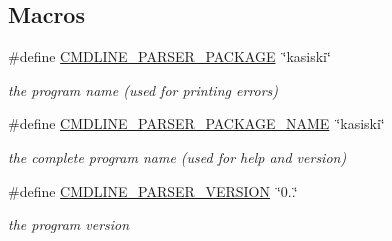 \subsection*{Macros}
\begin{DoxyCompactItemize}
\item 
\mbox{\label{kasiski-getopt_8h_aeb847973552c32bcbe5f14973a0a8a32}} 
\#define \hyperlink{kasiski-getopt_8h_aeb847973552c32bcbe5f14973a0a8a32}{C\+M\+D\+L\+I\+N\+E\+\_\+\+P\+A\+R\+S\+E\+R\+\_\+\+P\+A\+C\+K\+A\+GE}~\char`\"{}kasiski\char`\"{}
\begin{DoxyCompactList}\small\item\em the program name (used for printing errors) \end{DoxyCompactList}\item 
\mbox{\label{kasiski-getopt_8h_ae2f94765d0d8758ddf6b326a4806d6ff}} 
\#define \hyperlink{kasiski-getopt_8h_ae2f94765d0d8758ddf6b326a4806d6ff}{C\+M\+D\+L\+I\+N\+E\+\_\+\+P\+A\+R\+S\+E\+R\+\_\+\+P\+A\+C\+K\+A\+G\+E\+\_\+\+N\+A\+ME}~\char`\"{}kasiski\char`\"{}
\begin{DoxyCompactList}\small\item\em the complete program name (used for help and version) \end{DoxyCompactList}\item 
\mbox{\label{kasiski-getopt_8h_a1eeca7dc254bf6867ba9635f45771471}} 
\#define \hyperlink{kasiski-getopt_8h_a1eeca7dc254bf6867ba9635f45771471}{C\+M\+D\+L\+I\+N\+E\+\_\+\+P\+A\+R\+S\+E\+R\+\_\+\+V\+E\+R\+S\+I\+ON}~\char`\"{}0..\char`\"{}
\begin{DoxyCompactList}\small\item\em the program version \end{DoxyCompactList}\end{DoxyCompactItemize}
